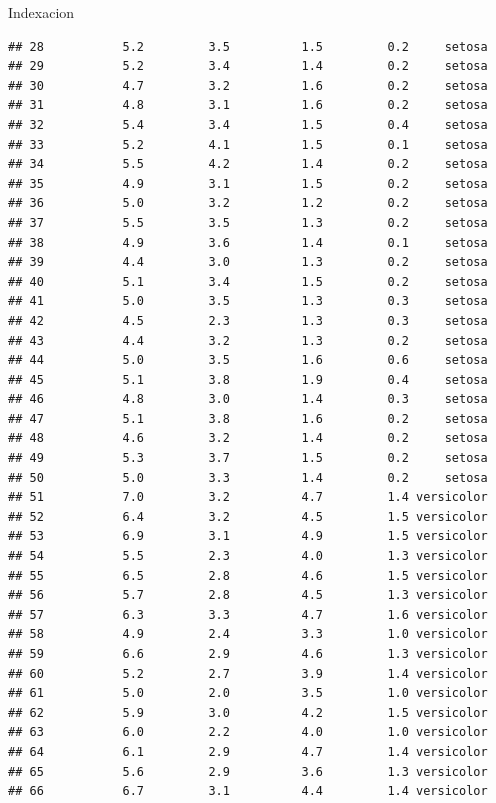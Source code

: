 \documentclass[
  ignorenonframetext,
]{beamer}
\begin{document}
\begin{frame}[fragile]{Indexacion}
\begin{verbatim}
## 28           5.2         3.5          1.5         0.2     setosa
## 29           5.2         3.4          1.4         0.2     setosa
## 30           4.7         3.2          1.6         0.2     setosa
## 31           4.8         3.1          1.6         0.2     setosa
## 32           5.4         3.4          1.5         0.4     setosa
## 33           5.2         4.1          1.5         0.1     setosa
## 34           5.5         4.2          1.4         0.2     setosa
## 35           4.9         3.1          1.5         0.2     setosa
## 36           5.0         3.2          1.2         0.2     setosa
## 37           5.5         3.5          1.3         0.2     setosa
## 38           4.9         3.6          1.4         0.1     setosa
## 39           4.4         3.0          1.3         0.2     setosa
## 40           5.1         3.4          1.5         0.2     setosa
## 41           5.0         3.5          1.3         0.3     setosa
## 42           4.5         2.3          1.3         0.3     setosa
## 43           4.4         3.2          1.3         0.2     setosa
## 44           5.0         3.5          1.6         0.6     setosa
## 45           5.1         3.8          1.9         0.4     setosa
## 46           4.8         3.0          1.4         0.3     setosa
## 47           5.1         3.8          1.6         0.2     setosa
## 48           4.6         3.2          1.4         0.2     setosa
## 49           5.3         3.7          1.5         0.2     setosa
## 50           5.0         3.3          1.4         0.2     setosa
## 51           7.0         3.2          4.7         1.4 versicolor
## 52           6.4         3.2          4.5         1.5 versicolor
## 53           6.9         3.1          4.9         1.5 versicolor
## 54           5.5         2.3          4.0         1.3 versicolor
## 55           6.5         2.8          4.6         1.5 versicolor
## 56           5.7         2.8          4.5         1.3 versicolor
## 57           6.3         3.3          4.7         1.6 versicolor
## 58           4.9         2.4          3.3         1.0 versicolor
## 59           6.6         2.9          4.6         1.3 versicolor
## 60           5.2         2.7          3.9         1.4 versicolor
## 61           5.0         2.0          3.5         1.0 versicolor
## 62           5.9         3.0          4.2         1.5 versicolor
## 63           6.0         2.2          4.0         1.0 versicolor
## 64           6.1         2.9          4.7         1.4 versicolor
## 65           5.6         2.9          3.6         1.3 versicolor
## 66           6.7         3.1          4.4         1.4 versicolor

\end{verbatim}
\end{frame}
\end{document}
